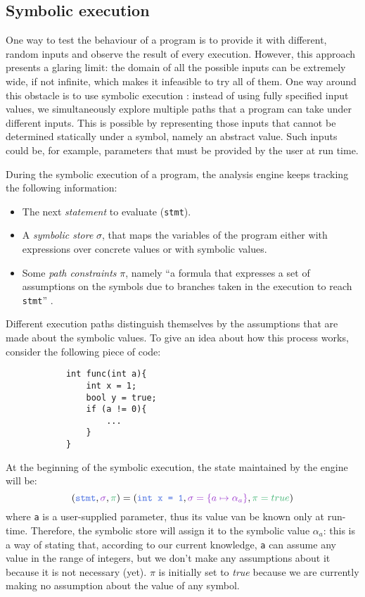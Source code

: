 \documentclass[12pt,a4paper]{book}
\theoremstyle{definition}
\begin{document}
	\subsection{Symbolic execution}\label{sec:symbolic-exec}
	One way to test the behaviour of a program is to provide it with different, random inputs and observe the result of every execution. However, this approach presents a glaring limit: the domain of all the possible inputs can be extremely wide, if not infinite, which makes it infeasible to try all of them. One way around this obstacle is to use symbolic execution \cite{Baldoni2018} \cite{King76}: instead of using fully specified input values, we simultaneously explore multiple paths that a program can take under different inputs. This is possible by representing those inputs that cannot be determined statically under a symbol, namely an abstract value. Such inputs could be, for example, parameters that must be provided by the user at run time.
	
	During the symbolic execution of a program, the analysis engine keeps tracking the following information:
	\begin{itemize}
		\item The next \textit{statement} to evaluate (\texttt{stmt}).
		\item A \textit{symbolic store} $\sigma$, that maps the variables of the program either with expressions over concrete values or with symbolic values.
		\item Some \textit{path constraints} $\pi$, namely ``a formula that expresses a set of assumptions on the symbols due to branches taken in the execution to reach \texttt{stmt}'' \cite{Baldoni2018}.
	\end{itemize}
	Different execution paths distinguish themselves by the assumptions that are made about the symbolic values. To give an idea about how this process works, consider the following piece of code:
	
	\vspace{3mm}
	\begin{minipage}{.4\textwidth}
		\begin{lstlisting}
			int func(int a){
				int x = 1;
				bool y = true;
				if (a != 0){
					...
				}
			}
		\end{lstlisting} 
	\end{minipage}
	
	At the beginning of the symbolic execution, the state maintained by the engine will be:
	\[
	(\textcolor{blue}{\texttt{stmt}}, \textcolor{violet}{\sigma}, \textcolor{green}{\pi}) = (\textcolor{blue}{\texttt{int x = 1}}, \textcolor{violet}{\sigma = \{a \mapsto \alpha_a\}}, \textcolor{green}{\pi = true})
	\]
	where \texttt{a} is a user-supplied parameter, thus its value van be known only at run-time. Therefore, the symbolic store will assign it to the symbolic value $\alpha_a$: this is a way of stating that, according to our current knowledge, \texttt{a} can assume any value in the range of integers, but we don't make any assumptions about it because it is not necessary (yet). $\pi$ is initially set to \textit{true} because we are currently making no assumption about the value of any symbol.
	
\end{document}
